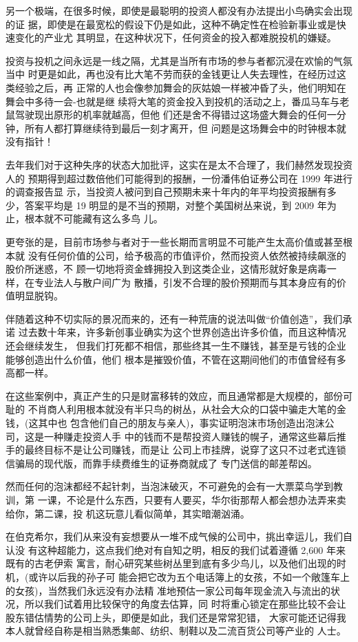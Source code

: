 \documentclass[UTF8,a4paper,zihao=-4,fontset = windows]{ctexart} %
\begin{document}
另一个极端，在很多时候，即使是最聪明的投资人都没有办法提出小鸟确实会出现的证
据，即使是在最宽松的假设下仍是如此，这种不确定性在检验新事业或是快速变化的产业尤
其明显，在这种状况下，任何资金的投入都难脱投机的嫌疑。

投资与投机之间永远是一线之隔，尤其是当所有市场的参与者都沉浸在欢愉的气氛当中
时更是如此，再也没有比大笔不劳而获的金钱更让人失去理性，在经历过这类经验之后，再
正常的人也会像参加舞会的灰姑娘一样被冲昏了头，他们明知在舞会中多待一会-也就是继
续将大笔的资金投入到投机的活动之上，番瓜马车与老鼠驾驶现出原形的机率就越高，但他
们还是舍不得错过这场盛大舞会的任何一分钟，所有人都打算继续待到最后一刻才离开，但
问题是这场舞会中的时钟根本就没有指针！

去年我们对于这种失序的状态大加批评，这实在是太不合理了，我们赫然发现投资人的
预期得到超过数倍他们可能得到的报酬，一份潘伟伯证券公司在 1999 年进行的调查报告显
示，当投资人被问到自己预期未来十年内的年平均投资报酬有多少，答案平均是 19%
明显的是不当的预期，对整个美国树丛来说，到 2009 年为止，根本就不可能藏有这么多鸟
儿。

更夸张的是，目前市场参与者对于一些长期而言明显不可能产生太高价值或甚至根本就
没有任何价值的公司，给予极高的市值评价，然而投资人依然被持续飙涨的股价所迷惑，不
顾一切地将资金蜂拥投入到这类企业，这情形就好象是病毒一样，在专业法人与散户间广为
散播，引发不合理的股价预期而与其本身应有的价值明显脱钩。

伴随着这种不切实际的景况而来的，还有一种荒唐的说法叫做“价值创造”，我们承诺
过去数十年来，许多新创事业确实为这个世界创造出许多价值，而且这种情况还会继续发生，
但我们打死都不相信，那些终其一生不赚钱，甚至是亏钱的企业能够创造出什么价值，他们
根本是摧毁价值，不管在这期间他们的市值曾经有多高都一样。

在这些案例中，真正产生的只是财富移转的效应，而且通常都是大规模的，部份可耻的
不肖商人利用根本就没有半只鸟的树丛，从社会大众的口袋中骗走大笔的金钱，(这其中也
包含他们自己的朋友与亲人)，事实证明泡沫市场创造出泡沫公司，这是一种赚走投资人手
中的钱而不是帮投资人赚钱的幌子，通常这些幕后推手的最终目标不是让公司赚钱，而是让
公司上市挂牌，说穿了这只不过老式连锁信骗局的现代版，而靠手续费维生的证券商就成了
专门送信的邮差帮凶。

然而任何的泡沫都经不起针刺，当泡沫破灭，不可避免的会有一大票菜鸟学到教训，第
一课，不论是什么东西，只要有人要买，华尔街那帮人都会想办法弄来卖给你，第二课，投
机这玩意儿看似简单，其实暗潮汹涌。

在伯克希尔，我们从来没有妄想要从一堆不成气候的公司中，挑出幸运儿，我们自认没
有这种超能力，这点我们绝对有自知之明，相反的我们试着遵循 2,600 年来既有的古老伊索
寓言，耐心研究某些树丛里到底有多少鸟儿，以及他们出现的时机，(或许以后我的孙子可
能会把它改为五个电话簿上的女孩，不如一个敞篷车上的女孩)，当然我们永远没有办法精
准地预估一家公司每年现金流入与流出的状况，所以我们试着用比较保守的角度去估算，同
时将重心锁定在那些比较不会让股东错估情势的公司上头，即便是如此，我们还是常常犯错，
大家可能还记得我本人就曾经自称是相当熟悉集邮、纺织、制鞋以及二流百货公司等产业的
人士。
\end{document}
